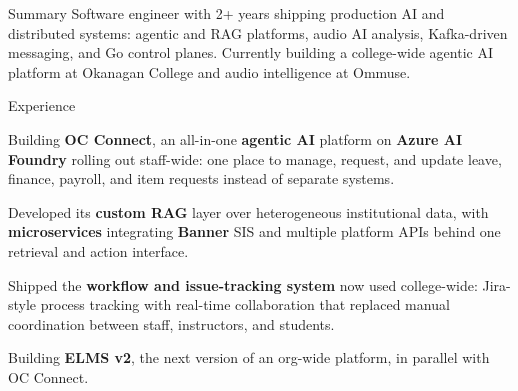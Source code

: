 \documentclass{resume}
\begin{document}
\vspace{-.5em}
\begin{rSection}{Summary}
{\scriptsize Software engineer with 2+ years shipping production AI and distributed systems: agentic and RAG platforms, audio AI analysis, Kafka-driven messaging, and Go control planes. Currently building a college-wide agentic AI platform at Okanagan College and audio intelligence at Ommuse.}
\end{rSection}\vspace{-0.6em}

\begin{rSection}{Experience}
\scriptsize

\begin{jobitems}
    \item Building \textbf{OC Connect}, an all-in-one \textbf{agentic AI} platform on \textbf{Azure AI Foundry} rolling out staff-wide: one place to manage, request, and update leave, finance, payroll, and item requests instead of separate systems.
    \item Developed its \textbf{custom RAG} layer over heterogeneous institutional data, with \textbf{microservices} integrating \textbf{Banner} SIS and multiple platform APIs behind one retrieval and action interface.
    \item Shipped the \textbf{workflow and issue-tracking system} now used college-wide: Jira-style process tracking with real-time collaboration that replaced manual coordination between staff, instructors, and students.
    \item Building \textbf{ELMS v2}, the next version of an org-wide platform, in parallel with OC Connect.
\end{jobitems}


\end{rSection}
\end{document}
